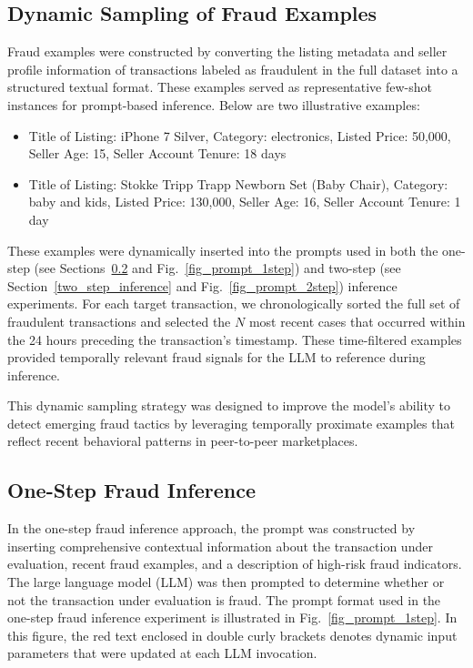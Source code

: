 \documentclass[sigconf]{acmart}
\begin{document}
\subsection{Dynamic Sampling of Fraud Examples}\label{fraud_examples}
Fraud examples were constructed by converting the listing metadata and seller profile information of transactions labeled as fraudulent in the full dataset into a structured textual format. These examples served as representative few-shot instances for prompt-based inference. Below are two illustrative examples:

\begin{itemize}
  \item Title of Listing: iPhone 7 Silver, Category: electronics, Listed Price: 50,000, Seller Age: 15, Seller Account Tenure: 18 days
  \item Title of Listing: Stokke Tripp Trapp Newborn Set (Baby Chair), Category: baby and kids, Listed Price: 130,000, Seller Age: 16, Seller Account Tenure: 1 day
\end{itemize}

These examples were dynamically inserted into the prompts used in both the one-step (see Sections~\ref{one_step_inference} and Fig.~\ref{fig_prompt_1step}) and two-step (see Section~\ref{two_step_inference} and Fig.~\ref{fig_prompt_2step}) inference experiments. For each target transaction, we chronologically sorted the full set of fraudulent transactions and selected the $N$ most recent cases that occurred within the 24 hours preceding the transaction's timestamp. These time-filtered examples provided temporally relevant fraud signals for the LLM to reference during inference.

This dynamic sampling strategy was designed to improve the model's ability to detect emerging fraud tactics by leveraging temporally proximate examples that reflect recent behavioral patterns in peer-to-peer marketplaces.


\subsection{One-Step Fraud Inference}\label{one_step_inference}
In the one-step fraud inference approach, the prompt was constructed by inserting comprehensive contextual information about the transaction under evaluation, recent fraud examples, and a description of high-risk fraud indicators. The large language model (LLM) was then prompted to determine whether or not the transaction under evaluation is fraud. The prompt format used in the one-step fraud inference experiment is illustrated in Fig.~\ref{fig_prompt_1step}. In this figure, the red text enclosed in double curly brackets denotes dynamic input parameters that were updated at each LLM invocation.
\end{document}
